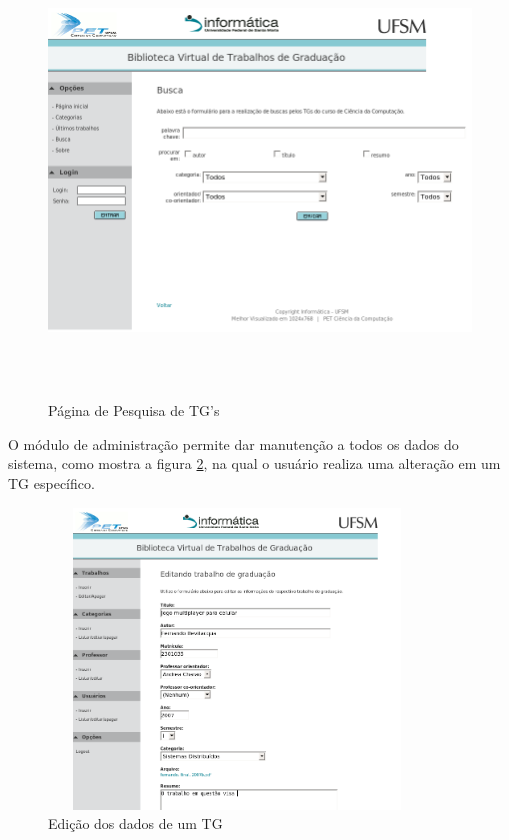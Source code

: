 \documentclass[12pt]{article}
\begin{document}
\begin{figure}[ht]
\centering
\includegraphics [width = 12cm, height = 12cm]
{img/busca.png}
\caption{P\'{a}gina de Pesquisa de TG's}
\label{f:pesquisa}
\end{figure}

O m\'{o}dulo de administra\c{c}\~{a}o permite dar manuten\c{c}\~{a}o a todos os dados do sistema, como mostra a figura \ref{f:edicao}, na qual o usu\'{a}rio realiza uma altera\c{c}\~{a}o em um TG espec\'{i}fico.

\begin{figure}[ht]
\centering
\includegraphics [width = 10cm, height = 8cm]
{img/edicao.png}
\caption{Edi\c{c}\~{a}o dos dados de um TG}
\label{f:edicao}
\end{figure}
\end{document}

